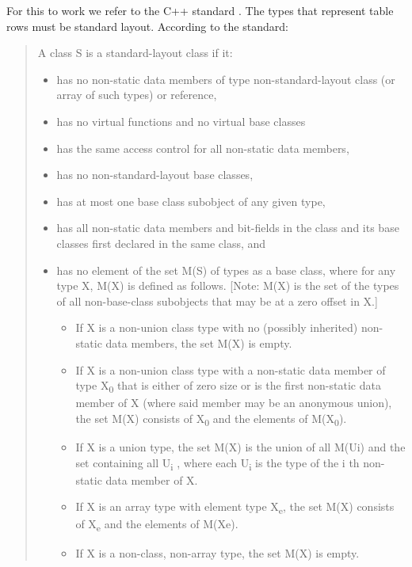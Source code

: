 For this to work we refer to the C++ standard
\cite{14:00-17:00ISOIEC14882}. The types that represent table rows must
be standard layout. According to the standard:

\begin{quote}
A class S is a standard-layout class if it:
\begin{itemize}
\item has no non-static data members of type non-standard-layout class (or
array of such types) or reference,
\item has no virtual functions and no virtual base classes
\item has the same access control for all non-static data members,
\item has no non-standard-layout base classes,
\item has at most one base class subobject of any given type,
\item has all non-static data members and bit-fields in the class and its
base classes first declared in the same class, and
\item has no element of the set M(S) of types as a base class, where for
any type X, M(X) is defined as follows. [Note: M(X) is the set of
the types of all non-base-class subobjects that may be at a zero
offset in X.]
\begin{itemize}
\item If X is a non-union class type with no (possibly inherited)
non-static data members, the set M(X) is empty.
\item If X is a non-union class type with a non-static data member of
type X\textsubscript{0} that is either of zero size or is the first non-static
data member of X (where said member may be an anonymous union),
the set M(X) consists of X\textsubscript{0} and the elements of M(X\textsubscript{0}).
\item If X is a union type, the set M(X) is the union of all M(Ui) and
the set containing all U\textsubscript{i} , where each U\textsubscript{i} is the type of the i
th non-static data member of X.
\item If X is an array type with element type X\textsubscript{e}, the set M(X) consists
of X\textsubscript{e} and the elements of M(Xe).
\item If X is a non-class, non-array type, the set M(X) is empty.
\end{itemize}
\end{itemize}
\end{quote}

